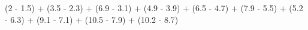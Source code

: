 \documentclass[preview]{standalone}
\begin{document}
\begin{center}
(2 - 1.5) + (3.5 - 2.3) + (6.9 - 3.1) + (4.9 - 3.9) + (6.5 - 4.7) + (7.9 - 5.5) + (5.2 - 6.3) + (9.1 - 7.1) + (10.5 - 7.9) + (10.2 - 8.7)
\end{center}
\end{document}
